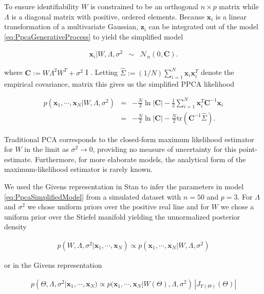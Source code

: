 \documentclass[ba]{imsart}
\newcommand{\mb}[1]{\mathbf{#1}}
\numberwithin{equation}{section}
\theoremstyle{plain}
\begin{document}
\noindent To ensure identifiability $W$ is constrained to be an orthogonal $n \times p$ matrix while $\Lambda$ is a diagonal matrix with positive, ordered elements. Because $\mb{x}_i$ is a linear transformation of a multivariate Gaussian, $\mb{z}_i$ can be integrated out of the model \ref{eq:PpcaGenerativeProcess} to yield the simplified model

\begin{eqnarray}
\label{eq:PpcaSimplifiedModel}
\mb{x}_i | W, \Lambda, \sigma^2 &\sim& \mathcal{N}_n(0, \textbf{C}).
\end{eqnarray}

\noindent where $\textbf{C} := W \Lambda^2 W^T + \sigma^2$ I \citep{murphy2012machine}. Letting $\hat{\Sigma} := (1/N) \sum_{i=1}^N \mb{x}_i \mb{x}_i^T$ denote the empirical covariance, matrix this gives us the simplified PPCA likelihood

\begin{eqnarray}
p(\mb{x}_1, \cdots, \mb{x}_N | W, \Lambda, \sigma^2) &=& -\frac{N}{2} \ln |\textbf{C}| - \frac{1}{2} \sum_{i=1}^N \mb{x}_i^T \textbf{C}^{-1} \mb{x}_i\\
&=& -\frac{N}{2} \ln |\textbf{C}| - \frac{N}{2} \mathrm{tr} (\textbf{C}^{-1} \hat{\Sigma}).
\label{eq:ppca_likelihood}
\end{eqnarray}

\noindent Traditional PCA corresponds to the closed-form maximum likelihood estimator for $W$ in the limit as $\sigma^2 \to 0$,  providing no measure of uncertainty for this point-estimate. Furthermore, for more elaborate models, the analytical form of the maximum-likelihood estimator is rarely known.

\noindent We used the Givens representation in Stan to infer the parameters in model \ref{eq:PpcaSimplifiedModel} from a simulated dataset with $n = 50$ and $p = 3$. For  $\Lambda$ and $\sigma^2$ we chose uniform priors over the positive real line and for $W$ we chose a uniform prior over the Stiefel manifold yielding the unnormalized posterior density

\begin{eqnarray}
p(W, \Lambda, \sigma^2 | \mb{x}_1, \cdots, \mb{x}_N) \propto p(\mb{x}_1, \cdots, \mb{x}_N | W, \Lambda, \sigma^2)
\end{eqnarray}

\noindent or in the Givens representation

\begin{eqnarray}
\label{eq:ppca_density_givens}
p(\Theta, \Lambda, \sigma^2 | \mb{x}_1, \cdots, \mb{x}_N) \propto p(\mb{x}_1, \cdots, \mb{x}_N | W(\Theta), \Lambda, \sigma^2)\, |J_{Y(\Theta)}(\Theta)|
\end{eqnarray}
\end{document}
